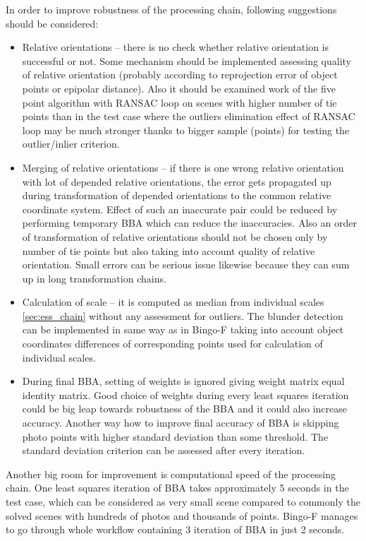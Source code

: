 \documentclass[a4paper,12pt]{article}
\begin{document}
In order to improve robustness of the processing chain, following suggestions should be considered:
\begin{itemize}
\item Relative orientations -- there is no check whether relative orientation is successful or not. Some mechanism 
should be implemented assessing quality of relative orientation (probably according to reprojection error of object points or 
epipolar distance).
Also it should be examined work of the five point algorithm with RANSAC loop on scenes with higher number of tie points 
than in the test case where 
the outliers elimination effect of RANSAC loop may be much stronger thanks to bigger sample (points) for testing the
outlier/inlier criterion.
\item  Merging of relative orientations -- if there is one wrong relative orientation with lot of depended relative orientations,
the error gets propagated up during transformation of depended orientations to the common relative coordinate system. 
Effect of such an inaccurate pair could be 
reduced by performing  temporary BBA which can reduce the inaccuracies. Also an order of transformation of relative orientations 
 should not 
be chosen only by number of tie points but also taking into account quality of relative orientation.
Small errors can be serious issue likewise because they can
sum up in long transformation chains. 
\item Calculation of scale -- it is computed as median from individual scales \ref{sec:ess_chain}
without any assessment for outliers. The blunder detection can be implemented in same way 
as in Bingo-F taking into account object coordinates differences of corresponding points used 
for calculation of individual scales.
\item During final BBA, setting of weights is ignored giving weight matrix equal identity matrix. 
Good choice of weights during every least squares iteration 
could be big leap towards robustness of the BBA and it could also increase accuracy. 
Another way how to improve final accuracy of BBA is skipping photo points with
higher standard deviation than some threshold. The standard deviation criterion can be assessed 
after every iteration.
\end{itemize}


Another big room for improvement is computational speed of the processing chain.
One least squares  iteration of BBA takes approximately 5 seconds in the test case, which can be 
considered as very small scene compared to commonly the solved
scenes with hundreds of photos and thousands of points. Bingo-F manages to go through whole workflow containing 
3 iteration of BBA in just 2 seconds.
\end{document}
